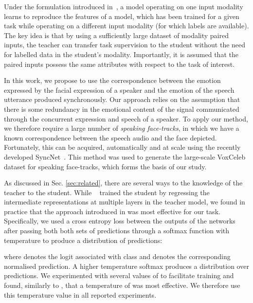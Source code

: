 \documentclass[sigconf]{acmart}
\begin{document}
Under the formulation introduced in~\cite{gupta2016cross}, a  model operating on one input modality learns to reproduce the features of a  model, which has been trained for a given task while operating on a different input modality (for which labels are available). The key idea is that by using a sufficiently large dataset of modality paired inputs, the teacher can transfer task supervision to the student without the need for labelled data in the student's modality. Importantly, it is assumed that the paired inputs possess the same attributes with respect to the task of interest.

In this work, we propose to use the correspondence between the emotion expressed by the facial expression of a speaker and the emotion of the speech utterance produced synchronously.  Our approach relies on the assumption that there is some redundancy in the emotional content of the signal communicated through the concurrent expression and speech of a speaker.   To apply our method, we therefore require a large number of \textit{speaking face-tracks}, in which we have a known correspondence between the speech audio and the face depicted.  Fortunately, this can be acquired, automatically and at scale using the recently developed SyncNet~\cite{Chung16a}.  This method was used to generate the large-scale VoxCeleb dataset \cite{Nagrani17} for speaking face-tracks, which forms the basis of our study.

As discussed in Sec. \ref{sec:related}, there are several ways to  the knowledge of the teacher to the student. While ~\cite{gupta2016cross} trained the student by regressing the intermediate representations at multiple layers in the teacher model, we found in practice that the approach introduced in \cite{hinton2015distilling} was most effective for our task.  Specifically, we used a cross entropy loss between the outputs of the networks after passing both both sets of predictions through a softmax function with temperature  to produce a distribution of predictions:



\noindent where  denotes the logit associated with class  and  denotes the corresponding normalised prediction.  A higher temperature softmax produces a  distribution over predictions. We experimented with several values of  to facilitate training and found, similarly to \cite{hinton2015distilling}, that a temperature of  was most effective.  We therefore use this temperature value in all reported experiments.  
\end{document}
